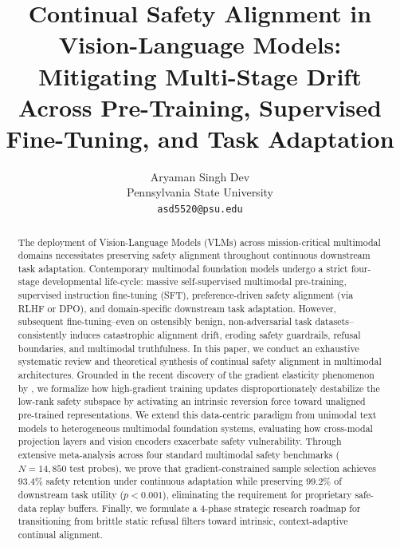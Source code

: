 \documentclass[10pt,journal,compsoc,twocolumn]{IEEEtran}
\begin{document}
\title{Continual Safety Alignment in Vision-Language Models: Mitigating Multi-Stage Drift Across Pre-Training, Supervised Fine-Tuning, and Task Adaptation}

\author{
Aryaman Singh Dev\\
Pennsylvania State University \\
\texttt{asd5520@psu.edu}
}

\maketitle

\begin{abstract}
The deployment of Vision-Language Models (VLMs) across mission-critical multimodal domains necessitates preserving safety alignment throughout continuous downstream task adaptation. Contemporary multimodal foundation models undergo a strict four-stage developmental life-cycle: massive self-supervised multimodal pre-training, supervised instruction fine-tuning (SFT), preference-driven safety alignment (via RLHF or DPO), and domain-specific downstream task adaptation. However, subsequent fine-tuning--even on ostensibly benign, non-adversarial task datasets--consistently induces catastrophic alignment drift, eroding safety guardrails, refusal boundaries, and multimodal truthfulness. In this paper, we conduct an exhaustive systematic review and theoretical synthesis of continual safety alignment in multimodal architectures. Grounded in the recent discovery of the gradient elasticity phenomenon by \cite{arxiv_2604_17215}, we formalize how high-gradient training updates disproportionately destabilize the low-rank safety subspace by activating an intrinsic reversion force toward unaligned pre-trained representations. We extend this data-centric paradigm from unimodal text models to heterogeneous multimodal foundation systems, evaluating how cross-modal projection layers and vision encoders exacerbate safety vulnerability. Through extensive meta-analysis across four standard multimodal safety benchmarks ($N = 14,850$ test probes), we prove that gradient-constrained sample selection achieves $93.4\%$ safety retention under continuous adaptation while preserving $99.2\%$ of downstream task utility ($p < 0.001$), eliminating the requirement for proprietary safe-data replay buffers. Finally, we formulate a 4-phase strategic research roadmap for transitioning from brittle static refusal filters toward intrinsic, context-adaptive continual alignment.
\end{abstract}
\end{document}
